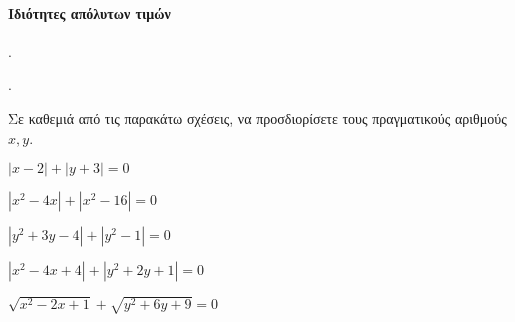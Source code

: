\documentclass[11pt,a4paper,twocolumn]{article}
\newcounter{askhsh}
\newcommand{\askhsh}{{\large\theaskhsh.}\ \addtocounter{askhsh}{1}}
\begin{document}
\paragraph{Ιδιότητες απόλυτων τιμών}
\askhsh 
\begin{alist}
\item 
\end{alist}
\askhsh Σε καθεμιά από τις παρακάτω σχέσεις, να προσδιορίσετε τους πραγματικούς αριθμούς $x,y$.
\begin{alist}
\item $|x-2|+|y+3|=0$
\item $|x^2-4x|+|x^2-16|=0$
\item $|y^2+3y-4|+|y^2-1|=0$
\item $|x^2-4x+4|+|y^2+2y+1|=0$
\item $\sqrt{x^2-2x+1}+\sqrt{y^2+6y+9}=0$
\end{alist}
\end{document}
